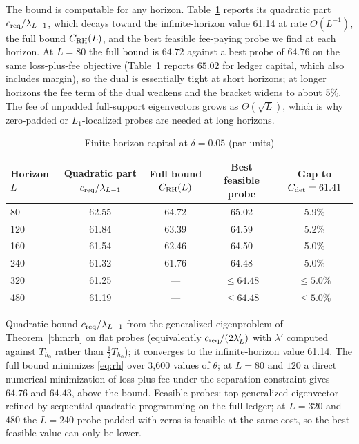 \documentclass[12pt]{article}
\theoremstyle{definition}
\theoremstyle{remark}
\begin{document}
The bound is computable for any horizon. Table~\ref{tab:rh} reports its quadratic part $c_{\rm req}/\lambda_{L-1}$, which decays toward the infinite-horizon value 61.14 at rate $O(L^{-1})$, the full bound $C_{\rm RH}(L)$, and the best feasible fee-paying probe we find at each horizon. At $L=80$ the full bound is $64.72$ against a best probe of $64.76$ on the same loss-plus-fee objective (Table~\ref{tab:rh} reports $65.02$ for ledger capital, which also includes margin), so the dual is essentially tight at short horizons; at longer horizons the fee term of the dual weakens and the bracket widens to about 5\%. The fee of unpadded full-support eigenvectors grows as $\Theta(\sqrt L)$, which is why zero-padded or $L_1$-localized probes are needed at long horizons.

\begin{table}[t]\centering\small
\begin{threeparttable}
\caption{Finite-horizon capital at $\delta=0.05$ (par units)}\label{tab:rh}
\setlength{\tabcolsep}{4pt}
\begin{tabular}{lcccc}
\toprule
Horizon $L$ & Quadratic part $c_{\rm req}/\lambda_{L-1}$ & Full bound $C_{\rm RH}(L)$ & Best feasible probe & Gap to $C_{\rm det}=61.41$\\
\midrule
80 & 62.55 & 64.72 & 65.02 & 5.9\%\\
120 & 61.84 & 63.39 & 64.59 & 5.2\%\\
160 & 61.54 & 62.46 & 64.50 & 5.0\%\\
240 & 61.32 & 61.76 & 64.48 & 5.0\%\\
320 & 61.25 & --- & $\le64.48$ & $\le5.0\%$\\
480 & 61.19 & --- & $\le64.48$ & $\le5.0\%$\\
\bottomrule
\end{tabular}
\begin{tablenotes}\footnotesize\item Quadratic bound $c_{\rm req}/\lambda_{L-1}$ from the generalized eigenproblem of Theorem~\ref{thm:rh} on flat probes (equivalently $c_{\rm req}/(2\lambda'_L)$ with $\lambda'$ computed against $T_{h_0}$ rather than $\tfrac12T_{h_0}$); it converges to the infinite-horizon value 61.14. The full bound minimizes \eqref{eq:rh} over 3{,}600 values of $\theta$; at $L=80$ and $120$ a direct numerical minimization of loss plus fee under the separation constraint gives $64.76$ and $64.43$, above the bound. Feasible probes: top generalized eigenvector refined by sequential quadratic programming on the full ledger; at $L=320$ and $480$ the $L=240$ probe padded with zeros is feasible at the same cost, so the best feasible value can only be lower. \end{tablenotes}
\end{threeparttable}
\end{table}
\end{document}
